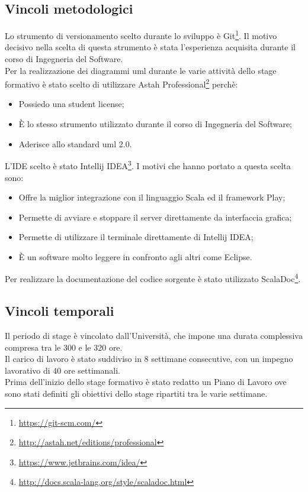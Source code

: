 \subsection{Vincoli metodologici}
Lo strumento di versionamento scelto durante lo sviluppo è Git\footnote{\url{https://git-scm.com/}}. Il motivo decisivo nella scelta di questa strumento è stata l'esperienza acquisita durante il corso di Ingegneria del Software.\\
Per la realizzazione dei diagrammi \gls{uml} durante le varie attività dello stage formativo è stato scelto di utilizzare Astah Professional\footnote{\url{http://astah.net/editions/professional}} perchè:
\begin{itemize}
	\item Possiedo una student license;
	\item È lo stesso strumento utilizzato durante il corso di Ingegneria del Software;
	\item Aderisce allo standard \gls{uml} 2.0.	
\end{itemize}
L'\gls{IDE} scelto è stato Intellij IDEA\footnote{\url{https://www.jetbrains.com/idea/}}. I motivi che hanno portato a questa scelta sono:
\begin{itemize}
	\item Offre la miglior integrazione con il linguaggio Scala ed il \gls{framework} Play;
	\item Permette di avviare e stoppare il server direttamente da interfaccia grafica;
	\item Permette di utilizzare il terminale direttamente di Intellij IDEA;
	\item È un software molto leggere in confronto agli altri come Eclipse.
\end{itemize}
Per realizzare la documentazione del codice sorgente è stato utilizzato ScalaDoc\footnote{\url{http://docs.scala-lang.org/style/scaladoc.html}}.

\subsection{Vincoli temporali}
Il periodo di stage è vincolato dall'Università, che impone una durata complessiva compresa tra le 300 e le 320 ore.\\
Il carico di lavoro è stato suddiviso in 8 settimane consecutive, con un impegno lavorativo di 40 ore settimanali.\\
Prima dell'inizio dello stage formativo è stato redatto un Piano di Lavoro ove sono stati definiti gli obiettivi dello stage ripartiti tra le varie settimane.